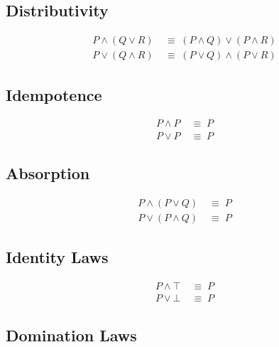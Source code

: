 \subsection{Distributivity}

\begin{theorem}[Distributivity]
\begin{align*}
P \wedge (Q \vee R) &\;\equiv\; (P \wedge Q) \vee (P \wedge R) \\
P \vee (Q \wedge R) &\;\equiv\; (P \vee Q) \wedge (P \vee R)
\end{align*}
\end{theorem}

\subsection{Idempotence}

\begin{theorem}[Idempotence]
\begin{align*}
P \wedge P &\;\equiv\; P \\
P \vee P &\;\equiv\; P
\end{align*}
\end{theorem}

\subsection{Absorption}

\begin{theorem}[Absorption]
\begin{align*}
P \wedge (P \vee Q) &\;\equiv\; P \\
P \vee (P \wedge Q) &\;\equiv\; P
\end{align*}
\end{theorem}

\subsection{Identity Laws}

\begin{theorem}
\begin{align*}
P \wedge \top &\;\equiv\; P \\
P \vee \bot &\;\equiv\; P
\end{align*}
\end{theorem}

\subsection{Domination Laws}

